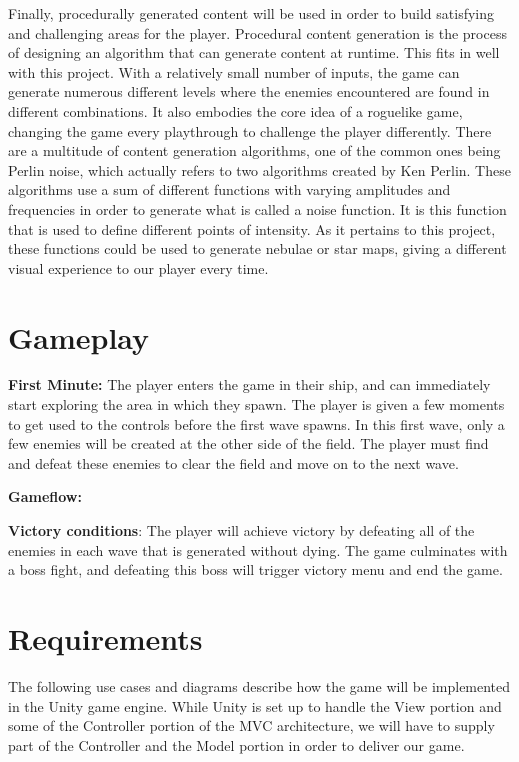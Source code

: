\documentclass[12pt]{article}       %
\def\hs{\hspace{15pt}}
\begin{document}
	Finally, procedurally generated content will be used in order to build satisfying and challenging areas for the player. Procedural content generation is the process of designing an algorithm that can generate content at runtime. This fits in well with this project. With a relatively small number of inputs, the game can generate numerous different levels where the enemies encountered are found in different combinations. It also embodies the core idea of a roguelike game, changing the game every playthrough to challenge the player differently. There are a multitude of content generation algorithms, one of the common ones being Perlin noise, which actually refers to two algorithms created by Ken Perlin. These algorithms use a sum of different functions with varying amplitudes and frequencies in order to generate what is called a noise function. It is this function that is used to define different points of intensity. As it pertains to this project, these functions could be used to generate nebulae or star maps, giving a different visual experience to our player every time. \cite{PCG}


\section{Gameplay} %
\label{sec:Gameplay}

{\bf First Minute: } The player enters the game in their ship, and can immediately start exploring the area in which they spawn. The player is given a few moments to get used to the controls before the first wave spawns. In this first wave, only a few enemies will be created at the other side of the field. The player must find and defeat these enemies to clear the field and move on to the next wave. 

{\bf Gameflow:} 


{\bf Victory conditions}: The player will achieve victory by defeating all of the enemies in each wave that is generated without dying. The game culminates with a boss fight, and defeating this boss will trigger victory menu and end the game.

\section{Requirements} %
\label{sec:Requirements}

\hs The following use cases and diagrams describe how the game will be implemented in the Unity game engine. While Unity is set up to handle the View portion and some of the Controller portion of the MVC architecture, we will have to supply part of the Controller and the Model portion in order to deliver our game.
\end{document}
